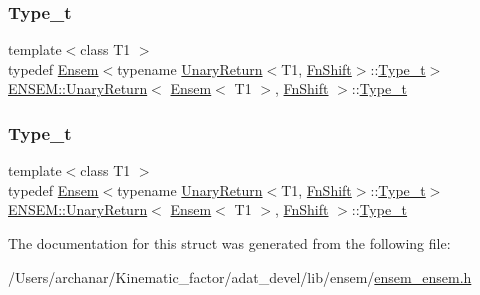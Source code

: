 \subsubsection{\texorpdfstring{Type\_t}{Type\_t}\hspace{0.1cm}{\footnotesize\ttfamily [1/2]}}
{\footnotesize\ttfamily template$<$class T1 $>$ \\
typedef \mbox{\hyperlink{classENSEM_1_1Ensem}{Ensem}}$<$typename \mbox{\hyperlink{structENSEM_1_1UnaryReturn}{Unary\+Return}}$<$T1, \mbox{\hyperlink{structENSEM_1_1FnShift}{Fn\+Shift}}$>$\+::\mbox{\hyperlink{structENSEM_1_1UnaryReturn_3_01Ensem_3_01T1_01_4_00_01FnShift_01_4_aed1937a9071e7b8f1a036bdb1860c54d}{Type\+\_\+t}}$>$ \mbox{\hyperlink{structENSEM_1_1UnaryReturn}{E\+N\+S\+E\+M\+::\+Unary\+Return}}$<$ \mbox{\hyperlink{classENSEM_1_1Ensem}{Ensem}}$<$ T1 $>$, \mbox{\hyperlink{structENSEM_1_1FnShift}{Fn\+Shift}} $>$\+::\mbox{\hyperlink{structENSEM_1_1UnaryReturn_3_01Ensem_3_01T1_01_4_00_01FnShift_01_4_aed1937a9071e7b8f1a036bdb1860c54d}{Type\+\_\+t}}}

\mbox{\label{structENSEM_1_1UnaryReturn_3_01Ensem_3_01T1_01_4_00_01FnShift_01_4_aed1937a9071e7b8f1a036bdb1860c54d}} 
\subsubsection{\texorpdfstring{Type\_t}{Type\_t}\hspace{0.1cm}{\footnotesize\ttfamily [2/2]}}
{\footnotesize\ttfamily template$<$class T1 $>$ \\
typedef \mbox{\hyperlink{classENSEM_1_1Ensem}{Ensem}}$<$typename \mbox{\hyperlink{structENSEM_1_1UnaryReturn}{Unary\+Return}}$<$T1, \mbox{\hyperlink{structENSEM_1_1FnShift}{Fn\+Shift}}$>$\+::\mbox{\hyperlink{structENSEM_1_1UnaryReturn_3_01Ensem_3_01T1_01_4_00_01FnShift_01_4_aed1937a9071e7b8f1a036bdb1860c54d}{Type\+\_\+t}}$>$ \mbox{\hyperlink{structENSEM_1_1UnaryReturn}{E\+N\+S\+E\+M\+::\+Unary\+Return}}$<$ \mbox{\hyperlink{classENSEM_1_1Ensem}{Ensem}}$<$ T1 $>$, \mbox{\hyperlink{structENSEM_1_1FnShift}{Fn\+Shift}} $>$\+::\mbox{\hyperlink{structENSEM_1_1UnaryReturn_3_01Ensem_3_01T1_01_4_00_01FnShift_01_4_aed1937a9071e7b8f1a036bdb1860c54d}{Type\+\_\+t}}}



The documentation for this struct was generated from the following file\+:\begin{DoxyCompactItemize}
\item 
/\+Users/archanar/\+Kinematic\+\_\+factor/adat\+\_\+devel/lib/ensem/\mbox{\hyperlink{lib_2ensem_2ensem__ensem_8h}{ensem\+\_\+ensem.\+h}}\end{DoxyCompactItemize}
